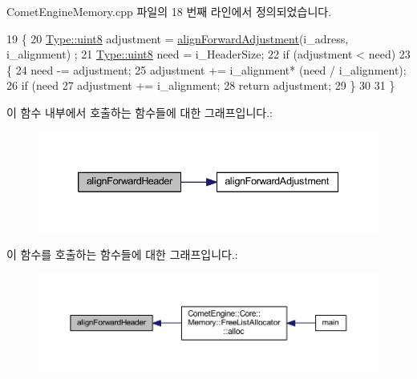 Comet\+Engine\+Memory.\+cpp 파일의 18 번째 라인에서 정의되었습니다.


\begin{DoxyCode}
19 \{
20     \hyperlink{namespace_comet_engine_1_1_type_a1b09856a6463f2bcc4bd8ff0e4e3ee0f}{Type::uint8} adjustment = \hyperlink{namespace_comet_engine_1_1_core_1_1_memory_1_1_utils_aa5a0140d498d631a747be87791063f2d}{alignForwardAdjustment}(i\_adress, i\_alignment)
      ;
21     \hyperlink{namespace_comet_engine_1_1_type_a1b09856a6463f2bcc4bd8ff0e4e3ee0f}{Type::uint8} need = i\_HeaderSize;
22     \textcolor{keywordflow}{if} (adjustment < need)
23     \{
24         need -= adjustment;
25         adjustment += i\_alignment* (need / i\_alignment);
26         \textcolor{keywordflow}{if} (need %
27             adjustment += i\_alignment;
28         \textcolor{keywordflow}{return} adjustment;
29     \}
30 
31 \}
\end{DoxyCode}
이 함수 내부에서 호출하는 함수들에 대한 그래프입니다.\+:\nopagebreak
\begin{figure}[H]
\begin{center}
\leavevmode
\includegraphics[width=339pt]{namespace_comet_engine_1_1_core_1_1_memory_1_1_utils_a57bbceefc56fa0e2ec1e472d85ce5e19_cgraph}
\end{center}
\end{figure}
이 함수를 호출하는 함수들에 대한 그래프입니다.\+:\nopagebreak
\begin{figure}[H]
\begin{center}
\leavevmode
\includegraphics[width=350pt]{namespace_comet_engine_1_1_core_1_1_memory_1_1_utils_a57bbceefc56fa0e2ec1e472d85ce5e19_icgraph}
\end{center}
\end{figure}
\mbox{\label{namespace_comet_engine_1_1_core_1_1_memory_1_1_utils_a4e360b8988f0de099daa987e3b5f09ed}} 
